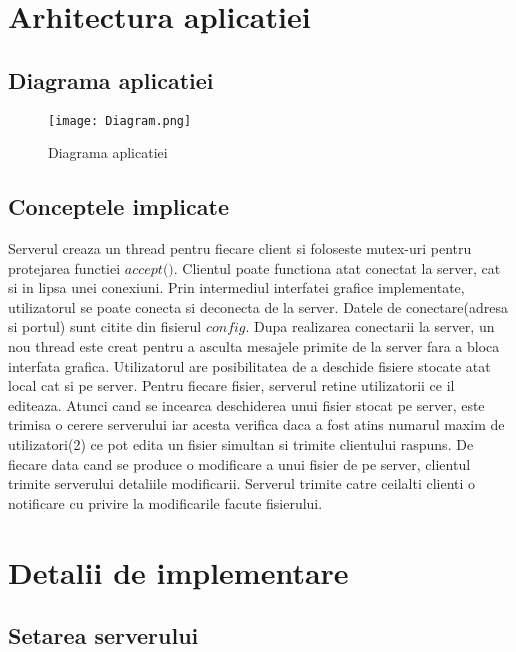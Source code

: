 \documentclass[runningheads]{llncs}
\begin{document}
\section{Arhitectura aplicatiei}

\subsection{Diagrama aplicatiei}
\begin{figure}[H]
    \texttt{[image: Diagram.png]}
    \caption{Diagrama aplicatiei}
    \label{Fig1}
\end{figure}

\subsection{Conceptele implicate}

Serverul creaza un thread pentru fiecare client si foloseste mutex-uri pentru protejarea functiei $\textit{accept()}$.
Clientul poate functiona atat conectat la server, cat si in lipsa unei conexiuni. Prin intermediul interfatei grafice implementate, utilizatorul se poate conecta si deconecta de la server.
Datele de conectare(adresa si portul) sunt citite din fisierul $\textit{config}$. 
Dupa realizarea conectarii la server, un nou thread este creat pentru a asculta mesajele primite de la server fara a bloca interfata grafica. 
Utilizatorul are posibilitatea de a deschide fisiere stocate atat local cat si pe server. Pentru fiecare fisier, serverul retine utilizatorii ce il editeaza. 
Atunci cand se incearca deschiderea unui fisier stocat pe server, este trimisa o cerere serverului iar acesta verifica daca a fost atins numarul maxim de utilizatori(2) ce pot edita un fisier simultan si trimite clientului raspuns.
De fiecare data cand se produce o modificare a unui fisier de pe server, clientul trimite serverului detaliile modificarii. Serverul trimite catre ceilalti clienti o notificare cu privire la modificarile facute fisierului.




\section{Detalii de implementare}
\lstset{
  basicstyle=\ttfamily,
  columns=fullflexible,
  frame=single,
  language=C++,
  breaklines=true
}
\subsection{Setarea serverului}
\end{document}
